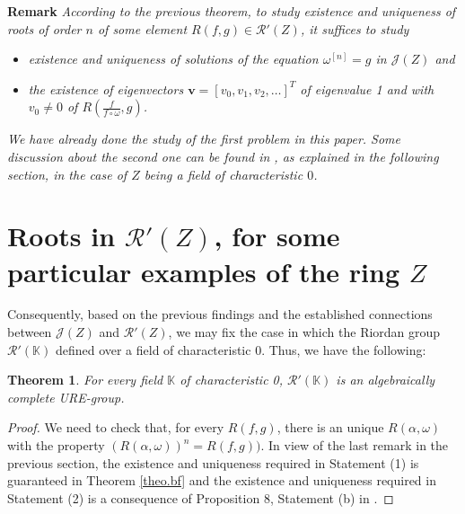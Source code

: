 \documentclass[preprint,12pt]{elsarticle}
\newtheorem{thm}{Theorem}
\begin{document}
\medskip

\noindent \textbf{Remark} \emph{According to the previous theorem, to study existence and uniqueness of roots of order $n$ of some element  $R(f,g)\in\mathcal R'(Z)$, it suffices to study}

\begin{itemize}
    \item[(1)]\emph{ existence and uniqueness of solutions of the equation $\omega^{[n]}=g$ in $\mathcal J(Z)$  and}
    \item[(2)] \emph{the existence of eigenvectors $\bm v=[v_0,v_1,v_2,\ldots]^T$ of eigenvalue 1 and with $v_0\neq 0$ of $R\left(\frac{f}{f \circ \omega},g\right)$.}
\end{itemize}  

\emph{We have already done the study of the first problem in this paper. Some discussion about the second one can be found in \cite{LMP}, as  explained in the following section, in the case of $Z$ being a field of characteristic $0$.}




\section{Roots in \texorpdfstring{$\mathcal R'(Z)$}{R'(Z)}, for some particular examples of the ring \texorpdfstring{$Z$}{Z}}\label{Section_RZexamples}

Consequently, based on the previous findings and the established connections between $\mathcal J(Z)$ and $\mathcal R'(Z)$, we may fix the case in which the Riordan group $\mathcal R'(\mathbb K)$ defined over a field of characteristic 0. Thus, we have the following:



\begin{thm} For every field $\mathbb K$ of characteristic 0, $\mathcal R'(\mathbb K)$ is an algebraically complete URE-group.


\end{thm}

\begin{proof} We need to check that, for every $R(f,g)$, there is an unique  $R(\alpha,\omega)$ with the property $(R(\alpha,\omega))^n=R(f,g))$. In view of the last remark in the previous section, the existence and uniqueness required in Statement (1) is guaranteed in Theorem \ref{theo.bf} and the existence and uniqueness required in Statement (2) is a consequence of  Proposition 8, Statement (b) in \cite{LMP}.
\end{proof}
\end{document}
